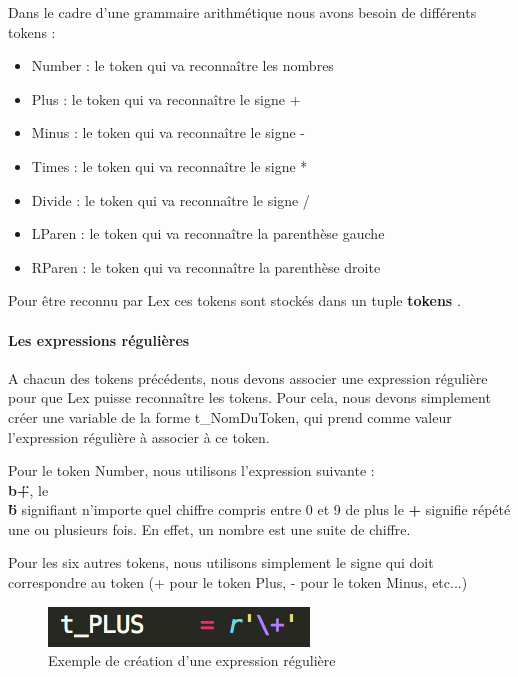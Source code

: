 \documentclass[a4paper,12pt]{article}
\begin{document}
				Dans le cadre d'une grammaire arithmétique nous avons besoin de différents tokens : 
				\begin{itemize}
					\item Number : le token qui va reconnaître les nombres
					\item Plus : le token qui va reconnaître le signe +
					\item Minus : le token qui va reconnaître le signe -
					\item Times : le token qui va reconnaître le signe *
					\item Divide : le token qui va reconnaître le signe /
					\item LParen : le token qui va reconnaître la parenthèse gauche
					\item RParen : le token qui va reconnaître la parenthèse droite
				\end{itemize}

				Pour être reconnu par Lex ces tokens sont stockés dans un tuple \textbf{tokens} .

			\paragraph{Les expressions régulières}

				A chacun des tokens précédents, nous devons associer une expression régulière pour que Lex puisse reconnaître les tokens.
				Pour cela, nous devons simplement créer une variable de la forme t\_NomDuToken, qui prend comme valeur l'expression régulière à associer à ce token.

				Pour le token Number, nous utilisons l'expression suivante : \textbf{\"\\b+\"}, le \textbf{\"\\b\"} signifiant n'importe quel chiffre compris entre 0 et 9 de plus le \textbf{+} signifie répété une ou plusieurs fois. En effet, un nombre est une suite de chiffre.

				Pour les six autres tokens, nous utilisons simplement le signe qui doit correspondre au token (+ pour le token Plus, - pour le token Minus, etc...)
			
				\begin{figure}[h!]
					\begin{center}
						\includegraphics[scale=1]{images/exp_regex}
						\caption{Exemple de création d'une expression régulière}
					\end{center}
				\end{figure}
\end{document}
